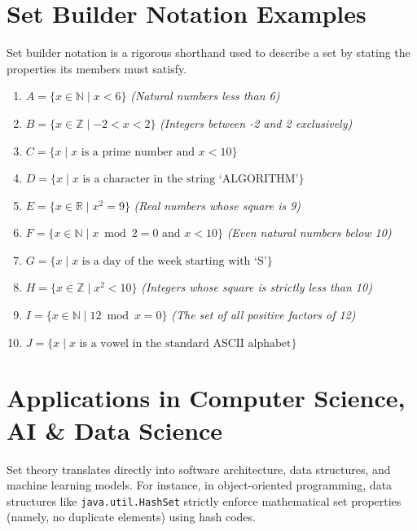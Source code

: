 \documentclass{article}
\begin{document}
\section{Set Builder Notation Examples}
Set builder notation is a rigorous shorthand used to describe a set by stating the properties its members must satisfy.

\begin{enumerate}
    \item $A = \{x \in \mathbb{N} \mid x < 6\}$ \textit{(Natural numbers less than 6)}
    \item $B = \{x \in \mathbb{Z} \mid -2 < x < 2\}$ \textit{(Integers between -2 and 2 exclusively)}
    \item $C = \{x \mid x \text{ is a prime number and } x < 10\}$
    \item $D = \{x \mid x \text{ is a character in the string `ALGORITHM'}\}$
    \item $E = \{x \in \mathbb{R} \mid x^2 = 9\}$ \textit{(Real numbers whose square is 9)}
    \item $F = \{x \in \mathbb{N} \mid x \bmod 2 = 0 \text{ and } x < 10\}$ \textit{(Even natural numbers below 10)}
    \item $G = \{x \mid x \text{ is a day of the week starting with `S'}\}$
    \item $H = \{x \in \mathbb{Z} \mid x^2 < 10\}$ \textit{(Integers whose square is strictly less than 10)}
    \item $I = \{x \in \mathbb{N} \mid 12 \bmod x = 0\}$ \textit{(The set of all positive factors of 12)}
    \item $J = \{x \mid x \text{ is a vowel in the standard ASCII alphabet}\}$
\end{enumerate}

\section{Applications in Computer Science, AI \& Data Science}
Set theory translates directly into software architecture, data structures, and machine learning models. For instance, in object-oriented programming, data structures like \texttt{java.util.HashSet} strictly enforce mathematical set properties (namely, no duplicate elements) using hash codes.
\end{document}
